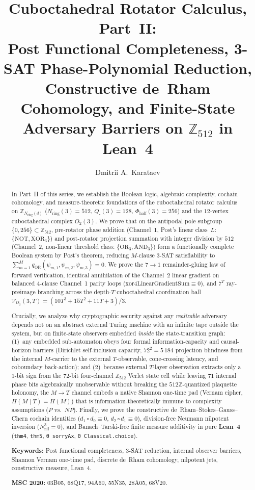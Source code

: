 \documentclass[11pt,a4paper]{article}
\title{\textbf{Cuboctahedral Rotator Calculus, Part~II:\\ Post Functional Completeness, 3-SAT Phase-Polynomial Reduction, Constructive de~Rham Cohomology, and Finite-State Adversary Barriers on $\mathbb{Z}_{512}$ in Lean~4}}
\author{Dmitrii A.~Karataev}
\date{}
\theoremstyle{plain}
\theoremstyle{definition}
\begin{document}
\maketitle

\begin{abstract}
In Part~II of this series, we establish the Boolean logic, algebraic complexity, cochain cohomology, and measure-theoretic foundations of the cuboctahedral rotator calculus on $\mathbb{Z}_{N_{\mathrm{ring}}(d)}$ ($N_{\mathrm{ring}}(3)=512$, $Q_\square(3)=128$, $\Phi_{\mathrm{half}}(3)=256$) and the $12$-vertex cuboctahedral complex $O_2(3)$. We prove that on the antipodal pole subgroup $\{0,256\}\subset\mathbb{Z}_{512}$, pre-rotator phase addition (Channel~1, Post's linear class~$L$: $\{\mathrm{NOT},\mathrm{XOR}_3\}$) and post-rotator projection summation with integer division by $512$ (Channel~2, non-linear threshold class: $\{\mathrm{OR}_3,\mathrm{AND}_3\}$) form a functionally complete Boolean system by Post's theorem, reducing $M$-clause 3-SAT satisfiability to $\sum_{m=1}^M q_{\mathrm{OR}}(\psi_{m,1},\psi_{m,2},\psi_{m,3}) = 0$. We prove the $7\to 1$ remainder-gluing law of forward verification, identical annihilation of the Channel~2 linear gradient on balanced $4$-clause Channel~1 parity loops ($\mathrm{xor4LinearGradientSum}\equiv 0$), and $7^T$ ray-preimage branching across the depth-$T$ cuboctahedral coordination ball $\mathcal{V}_{O_2}(3,T) = (10T^3+15T^2+11T+3)/3$.

Crucially, we analyze why cryptographic security against any \emph{realizable} adversary depends not on an abstract external Turing machine with an infinite tape outside the system, but on finite-state observers embedded \emph{inside} the state-transition graph: (1)~any embedded sub-automaton obeys four formal information-capacity and causal-horizon barriers (Dirichlet self-inclusion capacity, $72^2 = 5\,184$ projection blindness from the internal $M$-carrier to the external $T$-observable, cone-crossing latency, and coboundary back-action); and (2)~because external $T$-layer observation extracts only a $1$-bit sign from the $72$-bit four-channel $\mathbb{Z}_{512}$ Verlet state cell while leaving $71$ internal phase bits algebraically unobservable without breaking the $512\mathbb{Z}$-quantized plaquette holonomy, the $M\to T$ channel embeds a native Shannon one-time pad (Vernam cipher, $H(M\mid T)=H(M)$) that is information-theoretically immune to complexity assumptions ($P$ vs.\ $NP$). Finally, we prove the constructive de~Rham--Stokes--Gauss--Chern cochain identities ($d_1\circ d_0\equiv 0$, $d_2\circ d_1\equiv 0$), division-free Neumann nilpotent inversion ($N_{\mathrm{nil}}^3=0$), and Banach--Tarski-free finite measure additivity in pure \textbf{Lean~4} (\texttt{thm4}, \texttt{thm5}, \texttt{0 sorryAx}, \texttt{0 Classical.choice}).

\medskip\noindent
\textbf{Keywords:} Post functional completeness, 3-SAT reduction, internal observer barriers, Shannon Vernam one-time pad, discrete de~Rham cohomology, nilpotent jets, constructive measure, Lean~4.

\smallskip\noindent
\textbf{MSC 2020:} 03B05, 68Q17, 94A60, 55N35, 28A05, 68V20.
\end{abstract}
\end{document}
